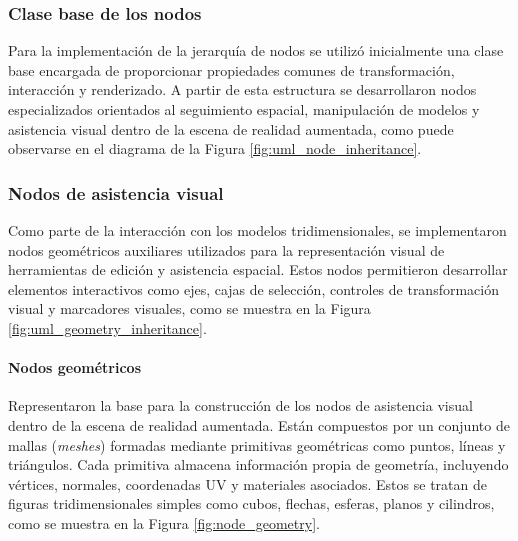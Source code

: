             

        \subsubsection{Clase base de los nodos}

            Para la implementación de la jerarquía de nodos se utilizó inicialmente una clase base encargada de proporcionar propiedades comunes de transformación, interacción y renderizado. A partir de esta estructura se desarrollaron nodos especializados orientados al seguimiento espacial, manipulación de modelos y asistencia visual dentro de la escena de realidad aumentada, como puede observarse en el diagrama de la Figura \ref{fig:uml_node_inheritance}.

            

        \subsubsection{Nodos de asistencia visual}

            Como parte de la interacción con los modelos tridimensionales, se implementaron nodos geométricos auxiliares utilizados para la representación visual de herramientas de edición y asistencia espacial. Estos nodos permitieron desarrollar elementos interactivos como ejes, cajas de selección, controles de transformación visual y marcadores visuales, como se muestra en la Figura \ref{fig:uml_geometry_inheritance}.

            

            \paragraph{Nodos geométricos}
            
                Representaron la base para la construcción de los nodos de asistencia visual dentro de la escena de realidad aumentada. Están compuestos por un conjunto de mallas (\textit{meshes}) formadas mediante primitivas geométricas como puntos, líneas y triángulos. Cada primitiva almacena información propia de geometría, incluyendo vértices, normales, coordenadas UV y materiales asociados. Estos se tratan de figuras tridimensionales simples como cubos, flechas, esferas, planos y cilindros, como se muestra en la Figura \ref{fig:node_geometry}.

